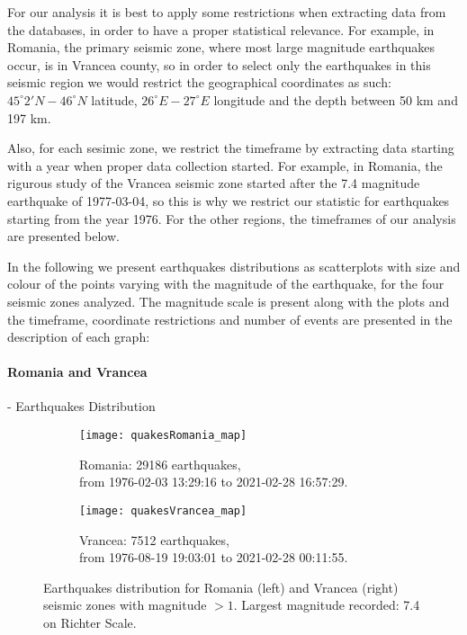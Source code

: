 For our analysis it is best to apply some restrictions when extracting data from the databases, in order to have a proper statistical relevance.
For example, in Romania, the primary seismic zone, where most large magnitude earthquakes occur, is in Vrancea county, so in order to select only the earthquakes in this seismic region we would restrict the geographical coordinates as such:
$45^{\circ}2'N-46^{\circ}N$ latitude, $26^{\circ}E-27^{\circ}E$ longitude and the depth between 50 km and 197 km.\par

Also, for each sesimic zone, we restrict the timeframe by extracting data starting with a year when proper data collection started. For example, in Romania, the rigurous study of the Vrancea seismic zone started after the 7.4 magnitude earthquake of 1977-03-04, so this is why we restrict our statistic for earthquakes starting from the year 1976. For the other regions, the timeframes of our analysis are presented below.\par 

In the following we present earthquakes distributions as scatterplots with size and colour of the points varying with the magnitude of the earthquake, for the four seismic zones analyzed. The magnitude scale is present along with the plots and the timeframe, coordinate restrictions and number of events are presented in the description of each graph:


\paragraph{Romania and Vrancea} - Earthquakes Distribution
\begin{figure}[!h]
\begin{subfigure}{.5\textwidth}
  \centering
  \texttt{[image: quakesRomania\_map]}
  \caption{Romania: 29186 earthquakes,\\ from 1976-02-03 13:29:16 to 2021-02-28 16:57:29.}
  \label{fig:sfigRo}
\end{subfigure}%
\begin{subfigure}{.5\textwidth}
  \centering
  \texttt{[image: quakesVrancea\_map]}
  \caption{Vrancea: 7512 earthquakes,\\ from 1976-08-19 19:03:01 to 2021-02-28 00:11:55.}
  \label{fig:sfigVrancea}
\end{subfigure}
\caption{Earthquakes distribution for Romania (left) and Vrancea (right) seismic zones with magnitude $>1$. Largest magnitude recorded: 7.4 on Richter Scale.}
\label{fig:simpleScatterRoVr}
\end{figure}

